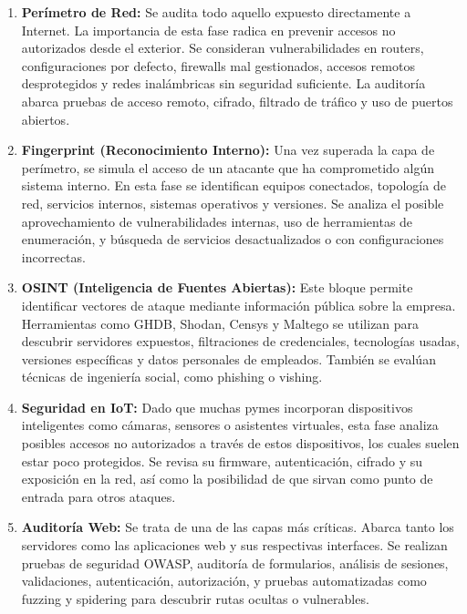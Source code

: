 \documentclass[a4paper, 10pt]{article}
\begin{document}
\begin{enumerate}
\item \textbf{Perímetro de Red:} Se audita todo aquello expuesto directamente a Internet. La importancia de esta fase radica en prevenir accesos no autorizados desde el exterior. Se consideran vulnerabilidades en routers, configuraciones por defecto, firewalls mal gestionados, accesos remotos desprotegidos y redes inalámbricas sin seguridad suficiente. La auditoría abarca pruebas de acceso remoto, cifrado, filtrado de tráfico y uso de puertos abiertos.

\item \textbf{Fingerprint (Reconocimiento Interno):} Una vez superada la capa de perímetro, se simula el acceso de un atacante que ha comprometido algún sistema interno. En esta fase se identifican equipos conectados, topología de red, servicios internos, sistemas operativos y versiones. Se analiza el posible aprovechamiento de vulnerabilidades internas, uso de herramientas de enumeración, y búsqueda de servicios desactualizados o con configuraciones incorrectas.

\item \textbf{OSINT (Inteligencia de Fuentes Abiertas):} Este bloque permite identificar vectores de ataque mediante información pública sobre la empresa. Herramientas como GHDB, Shodan, Censys y Maltego se utilizan para descubrir servidores expuestos, filtraciones de credenciales, tecnologías usadas, versiones específicas y datos personales de empleados. También se evalúan técnicas de ingeniería social, como phishing o vishing.

\item \textbf{Seguridad en IoT:} Dado que muchas pymes incorporan dispositivos inteligentes como cámaras, sensores o asistentes virtuales, esta fase analiza posibles accesos no autorizados a través de estos dispositivos, los cuales suelen estar poco protegidos. Se revisa su firmware, autenticación, cifrado y su exposición en la red, así como la posibilidad de que sirvan como punto de entrada para otros ataques.

\item \textbf{Auditoría Web:} Se trata de una de las capas más críticas. Abarca tanto los servidores como las aplicaciones web y sus respectivas interfaces. Se realizan pruebas de seguridad OWASP, auditoría de formularios, análisis de sesiones, validaciones, autenticación, autorización, y pruebas automatizadas como fuzzing y spidering para descubrir rutas ocultas o vulnerables.


\end{enumerate}
\end{document}
